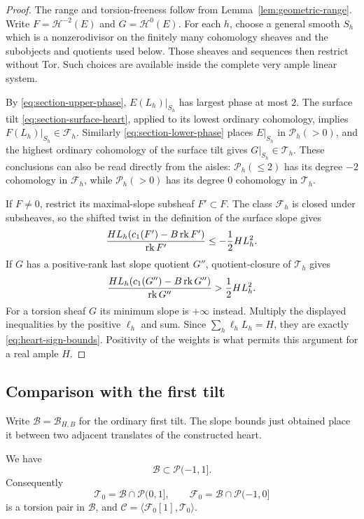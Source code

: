 \begin{proof}
The range and torsion-freeness follow from
Lemma~\ref{lem:geometric-range}.  Write $F=\mathcal H^{-2}(E)$ and
$G=\mathcal H^0(E)$.  For each $h$, choose a general smooth $S_h$ which
is a nonzerodivisor on the finitely many cohomology sheaves and the
subobjects and quotients used below.  Those sheaves and sequences then
restrict without Tor.  Such choices are available inside the complete
very ample linear system.

By \eqref{eq:section-upper-phase}, $E(L_h)|_{S_h}$ has largest phase at
most $2$.  The surface tilt \eqref{eq:section-surface-heart}, applied to
its lowest ordinary cohomology, implies
$F(L_h)|_{S_h}\in\mathcal F_h$.  Similarly
\eqref{eq:section-lower-phase} places $E|_{S_h}$ in
$\mathcal P_h(>0)$, and the highest ordinary cohomology of the surface
tilt gives $G|_{S_h}\in\mathcal T_h$.  These conclusions can also be
read directly from the aisles: $\mathcal P_h(\le2)$ has its degree $-2$
cohomology in $\mathcal F_h$, while $\mathcal P_h(>0)$ has its degree
$0$ cohomology in $\mathcal T_h$.

If $F\ne0$, restrict its maximal-slope subsheaf $F'\subset F$.
The class $\mathcal F_h$ is closed under subsheaves, so the shifted twist
in the definition of the surface slope gives
\[
 \frac{HL_h(c_1(F')-B\operatorname{rk} F')}{\operatorname{rk} F'}
       \le-\frac12HL_h^2.
\]
If $G$ has a positive-rank last slope quotient $G''$, quotient-closure of
$\mathcal T_h$ gives
\[
 \frac{HL_h(c_1(G'')-B\operatorname{rk} G'')}{\operatorname{rk} G''}
       >\frac12HL_h^2.
\]
For a torsion sheaf $G$ its minimum slope is $+\infty$ instead.
Multiply the displayed inequalities by the positive $\ell_h$ and sum.
Since $\sum_h\ell_hL_h=H$, they are exactly
\eqref{eq:heart-sign-bounds}.  Positivity of the weights is what permits
this argument for a real ample $H$.
\end{proof}

\subsection{Comparison with the first tilt}

Write $\mathcal B=\mathcal B_{H,B}$ for the ordinary first tilt.  The slope
bounds just obtained place it between two adjacent translates of the
constructed heart.

\begin{lemma}\label{lem:first-tilt-phase-range}
We have
\begin{equation}\label{eq:first-tilt-phase-range}
 \mathcal B\subset\mathcal P(-1,1].
\end{equation}
Consequently
\[
 \mathcal T_0=\mathcal B\cap\mathcal P(0,1],\qquad
 \mathcal F_0=\mathcal B\cap\mathcal P(-1,0]
\]
is a torsion pair in $\mathcal B$, and
$\mathcal C=\langle\mathcal F_0[1],\mathcal T_0\rangle$.
\end{lemma}

